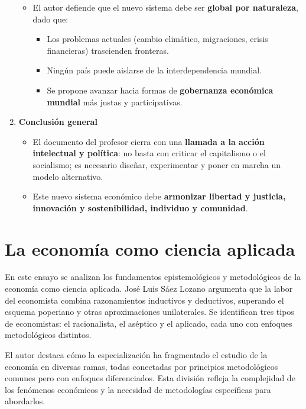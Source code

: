\documentclass[12pt]{book} %
\providecommand{\tightlist}{%
  \setlength{\itemsep}{0pt}\setlength{\parskip}{0pt}}
\begin{document}
\begin{enumerate}
  \begin{itemize}
  \tightlist
  \item
    El autor defiende que el nuevo sistema debe ser \textbf{global por
    naturaleza}, dado que:

    \begin{itemize}
    \tightlist
    \item
      Los problemas actuales (cambio climático, migraciones, crisis
      financieras) trascienden fronteras.
    \item
      Ningún país puede aislarse de la interdependencia mundial.
    \item
      Se propone avanzar hacia formas de \textbf{gobernanza económica
      mundial} más justas y participativas.
    \end{itemize}
  \end{itemize}
\item
  \textbf{Conclusión general}

  \begin{itemize}
  \tightlist
  \item
    El documento del profesor cierra con una \textbf{llamada a la acción
    intelectual y política}: no basta con criticar el capitalismo o el
    socialismo; es necesario diseñar, experimentar y poner en marcha un
    modelo alternativo.
  \item
    Este nuevo sistema económico debe \textbf{armonizar libertad y
    justicia, innovación y sostenibilidad, individuo y comunidad}.
  \end{itemize}
\end{enumerate}

\hypertarget{la-economuxeda-como-ciencia-aplicada}{%
\section{La economía como ciencia
aplicada}\label{la-economuxeda-como-ciencia-aplicada}}

En este ensayo se analizan los fundamentos epistemológicos y
metodológicos de la economía como ciencia aplicada. José Luis Sáez
Lozano argumenta que la labor del economista combina razonamientos
inductivos y deductivos, superando el esquema poperiano y otras
aproximaciones unilaterales. Se identifican tres tipos de economistas:
el racionalista, el aséptico y el aplicado, cada uno con enfoques
metodológicos distintos.

El autor destaca cómo la especialización ha fragmentado el estudio de la
economía en diversas ramas, todas conectadas por principios
metodológicos comunes pero con enfoques diferenciados. Esta división
refleja la complejidad de los fenómenos económicos y la necesidad de
metodologías específicas para abordarlos.
\end{document}
